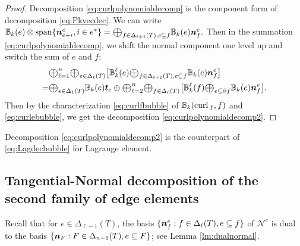 \documentclass[mathpazo]{cicp}
\newcommand{\Oplus}{\ensuremath{\vcenter{\hbox{\scalebox{1.5}{$\oplus$}}}}}
\begin{document}
\begin{proof}
Decomposition \eqref{eq:curlpolynomialdecomp} is the component form of decomposition \eqref{eq:Pkvecdec}. We can write $\mathbb B_k(e)\otimes \spa\{\bs n_{e+i}^e, i\in e^*\} = \Oplus_{f\in \Delta_{\ell+1}(T),e\subseteq f}\mathbb B_k( e)\boldsymbol{n}_{f}^e.$
Then in the summation \eqref{eq:curlpolynomialdecomp}, we shift the normal component one level up and switch the sum of $e$ and $f$:
\begin{align*}
&\Oplus_{\ell = 1}^n\Oplus_{e\in \Delta_{\ell}(T)} \big [ \mathbb B_{k}^{\ell}(e)\Oplus_{f\in \Delta_{\ell+1}(T),e\subseteq f}\mathbb B_k( e)\boldsymbol{n}_{f}^e \big ]\\
=&\Oplus_{e\in\Delta_{1}(T)}\mathbb B_k(e)\bs t_e \oplus \Oplus_{\ell=2}^n\Oplus_{f\in\Delta_{\ell}(T)}\big [\mathbb B_{k}^{\ell}(f) \Oplus_{e\subseteq \partial f}\mathbb B_k( e)\boldsymbol{n}_{f}^e \big ].
\end{align*}
Then by the characterization \eqref{eq:curlfbubble} of $\mathbb B_k({\rm curl\,}_f, f)$ and \eqref{eq:curlebubble}, we get the decomposition \eqref{eq:curlpolynomialdecomp2}.
%
\end{proof}
Decomposition \eqref{eq:curlpolynomialdecomp2} is the counterpart of \eqref{eq:Lagdecbubble} for Lagrange element. 

\subsection{Tangential-Normal decomposition of the second family of edge elements}
Recall that for $e\in\Delta_{\ell-1}(T)$, the basis 
$\{\boldsymbol n_{f}^e: f\in \Delta_{\ell}(T), e\subseteq f\}$ of $\mathscr{N}^e$ is dual to the basis $\{\boldsymbol n_{F}: F\in \Delta_{n-1}(T), e\subseteq F\}$; see Lemma \ref{lm:dualnormal}.  
\end{document}
